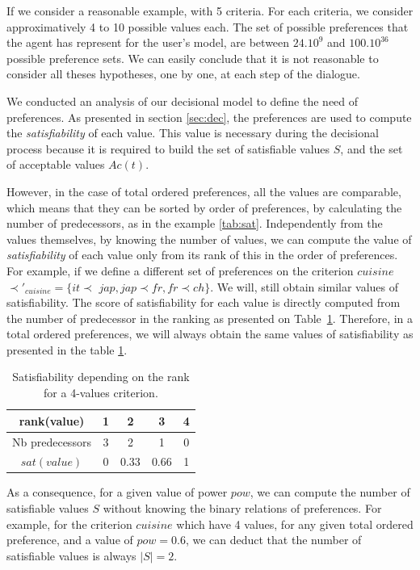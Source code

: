 \documentclass[conference, letterpaper]{IEEEtran}
\begin{document}
		If we consider a reasonable example, with 5 criteria. For each criteria, we consider approximatively 4 to 10 possible values each. The set of possible preferences that the agent has represent for the user's model, are between $24.10^9$ and $100.10^{36}$ possible preference sets. 
		We can easily conclude that it is not reasonable to consider all theses hypotheses, one by one, at each step of the dialogue.
	

		We conducted an analysis of our decisional model to define the need of preferences. As presented in section \ref{sec:dec}, the preferences are used to compute the \emph{satisfiability} of each value. %
		 This value is necessary during the decisional process because it is required to build the set of satisfiable values $S$, and the set of acceptable values $Ac(t)$.   
	
		However, in the case of total ordered preferences, all the values are comparable, which means that they can be sorted by order of preferences, by calculating the number of predecessors, as in the example \ref{tab:sat}. Independently from the values themselves, by knowing the number of values, we can compute the value of \emph{satisfiability} of each value only from its rank of this in the order of preferences. For example, if we define a different set of preferences  on the criterion $cuisine$ $\prec'_{cuisine} = \{it$$\prec$ $jap, jap$$\prec$$ fr, fr$$\prec$$ch\}$. We will, still obtain similar values of satisfiability. The score of satisfiability for each value is directly computed from the number of predecessor in the ranking as presented on Table~\ref{tab:poss}. Therefore, in a total ordered preferences, we will always obtain the same values of satisfiability as presented in the table \ref{tab:poss}. 
	\begin{table}[h]
		\caption{Satisfiability depending on the rank for a 4-values criterion.}
		\label{tab:poss}
		\centering
		\large
		\begin{tabular}{ |c|c|c|c|c| }
			\hline				
			rank(value) & 1 & 2 & 3 & 4 \\
			\hline
			Nb predecessors & 3 & 2 & 1& 0 \\
			\hline
			$sat(value)$ & 0 & 0.33 & 0.66 &1 \\
			\hline
		\end{tabular}
	\end{table}
	
	As a consequence, for a given value of power $pow$, we can compute the number of satisfiable values $S$ without knowing the binary relations of preferences. For example, for the criterion $cuisine$ which have 4 values, for any given total ordered preference, and a value of $pow = 0.6$, we can deduct that the number of satisfiable values is always $|S| = 2$.
	
\end{document}
